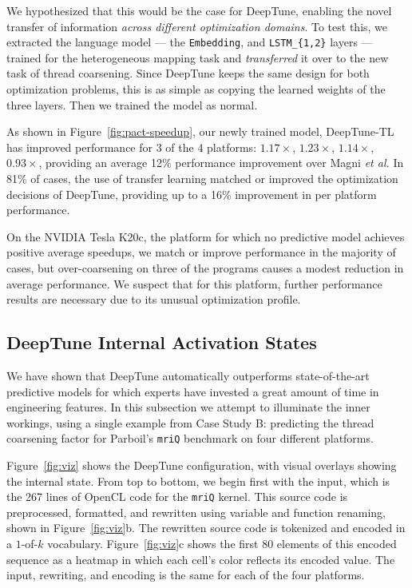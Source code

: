 We hypothesized that this would be the case for DeepTune, enabling the novel transfer of information \emph{across different optimization domains}. To test this, we extracted the language model --- the \texttt{Embedding}, and \texttt{LSTM\_\{1,2\}} layers --- trained for the heterogeneous mapping task and \emph{transferred} it over to the new task of thread coarsening. Since DeepTune keeps the same design for both optimization problems, this is as simple as copying the learned weights of the three layers. Then we trained the model as normal.

As shown in Figure~\ref{fig:pact-speedup}, our newly trained model, DeepTune-TL has improved performance for 3 of the 4 platforms: $1.17\times$, $1.23\times$, $1.14\times$, $0.93\times$, providing an average 12\% performance improvement over Magni \emph{et al.}  In 81\% of cases, the use of transfer learning matched or improved the optimization decisions of DeepTune, providing up to a 16\% improvement in per platform performance.

On the NVIDIA Tesla K20c, the platform for which no predictive model achieves positive average speedups, we match or improve performance in the majority of cases, but over-coarsening on three of the programs causes a modest reduction in average performance. We suspect that for this platform, further performance results are necessary due to its unusual optimization profile.


\subsection{DeepTune Internal Activation States}



We have shown that DeepTune automatically outperforms state-of-the-art predictive models for which experts have invested a great amount of time in engineering features. In this subsection we attempt to illuminate the inner workings, using a single example from Case Study B: predicting the thread coarsening factor for Parboil's \texttt{mriQ} benchmark on four different platforms.

Figure~\ref{fig:viz} shows the DeepTune configuration, with visual overlays showing the internal state. From top to bottom, we begin first with the input, which is the 267 lines of OpenCL code for the \texttt{mriQ} kernel. This source code is preprocessed, formatted, and rewritten using variable and function renaming, shown in Figure~\ref{fig:viz}b. The rewritten source code is tokenized and encoded in a $1$-of-$k$ vocabulary. Figure~\ref{fig:viz}c shows the first 80 elements of this encoded sequence as a heatmap in which each cell's color reflects its encoded value. The input, rewriting, and encoding is the same for each of the four platforms.

